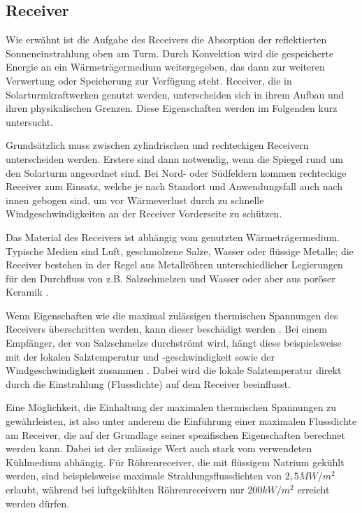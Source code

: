 \subsection{Receiver} \label{subsec_Receiver}

Wie erwähnt ist die Aufgabe des Receivers die Absorption der reflektierten Sonneneinstrahlung oben am Turm.
Durch Konvektion wird die gespeicherte Energie an ein Wärmeträgermedium weitergegeben, das dann zur weiteren Verwertung oder Speicherung zur Verfügung steht.
Receiver, die in Solarturmkraftwerken genutzt werden, unterscheiden sich in ihrem Aufbau und ihren physikalischen Grenzen. Diese Eigenschaften werden im Folgenden kurz untersucht.

Grundsätzlich muss zwischen zylindrischen und rechteckigen Receivern unterscheiden werden.
Erstere sind dann notwendig, wenn die Spiegel rund um den Solarturm angeordnet sind. Bei Nord- oder Südfeldern kommen rechteckige Receiver zum Einsatz, welche je nach Standort und Anwendungsfall auch nach innen gebogen sind, um vor Wärmeverlust durch zu schnelle Windgeschwindigkeiten an der Receiver Vorderseite zu schützen. \cite{Flesch}

Das Material des Receivers ist abhängig vom genutzten Wärmeträgermedium.
Typische Medien sind Luft, geschmolzene Salze, Wasser oder flüssige Metalle; die Receiver bestehen in der Regel aus Metallröhren unterschiedlicher Legierungen für den Durchfluss von z.B. Salzschmelzen und Wasser oder aber aus poröser Keramik \cite{Barlev}\cite{Ho2017}.

Wenn Eigenschaften wie die maximal zulässigen thermischen Spannungen des Receivers überschritten werden, kann dieser beschädigt werden \cite{AlbertoSanchez}.
Bei einem Empfänger, der von Salzschmelze durchströmt wird, hängt diese beispielsweise mit der lokalen Salztemperatur und -geschwindigkeit
sowie der Windgeschwindigkeit zusammen \cite{VantHull}.
Dabei wird die lokale Salztemperatur direkt durch die Einstrahlung (Flussdichte) auf dem Receiver beeinflusst.

Eine Möglichkeit, die Einhaltung der maximalen thermischen Spannungen zu gewährleisten, ist also unter anderem die Einführung einer maximalen Flussdichte am Receiver, die auf der Grundlage seiner spezifischen Eigenschaften berechnet werden kann.
Dabei ist der zulässige Wert auch stark vom verwendeten Kühlmedium abhängig.
Für Röhrenreceiver, die mit flüssigem Natrium gekühlt werden, sind beispielsweise maximale Strahlungsflussdichten von $2,5MW/m^2$ erlaubt, während bei luftgekühlten Röhrenreceivern nur $200kW/m^2$ \cite[S.17]{DissBelhomme} erreicht werden dürfen.

